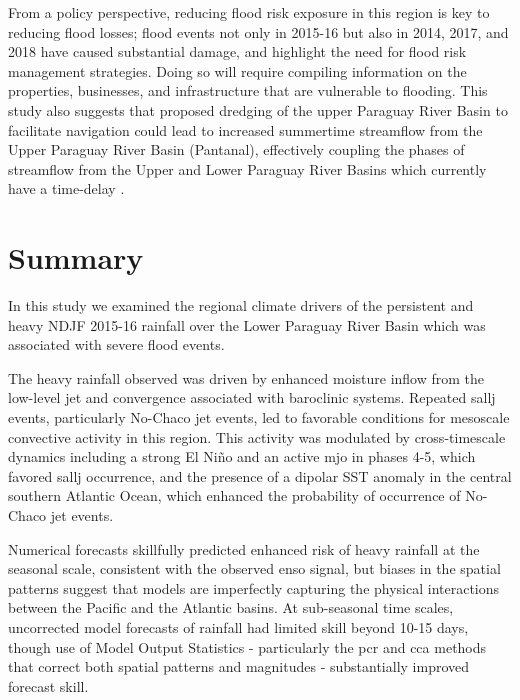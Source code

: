 \documentclass{ametsoc}
\begin{document}
From a policy perspective, reducing flood risk exposure in this region is key to reducing flood losses; flood events not only in 2015-16 but also in 2014, 2017, and 2018 have caused substantial damage, and highlight the need for flood risk management strategies.
Doing so will require compiling information on the properties, businesses, and infrastructure that are vulnerable to flooding.
This study also suggests that proposed dredging of the upper Paraguay River Basin to facilitate navigation could lead to increased summertime streamflow from the Upper Paraguay River Basin (Pantanal), effectively coupling the phases of streamflow from the Upper and Lower Paraguay River Basins which currently have a time-delay \citep{Bravo2011}.


\section{Summary} \label{sec:summary}

In this study we examined the regional climate drivers of the persistent and heavy NDJF 2015-16 rainfall over the Lower Paraguay River Basin which was associated with severe flood events.

The heavy rainfall observed was driven by enhanced moisture inflow from the low-level jet and convergence associated with baroclinic systems.
Repeated \gls{sallj} events, particularly No-Chaco jet events, led to favorable conditions for mesoscale convective activity in this region.
This activity was modulated by cross-timescale dynamics including a strong El Ni\~{n}o and an active \gls{mjo}  in phases 4-5, which favored \gls{sallj} occurrence, and the presence of a dipolar SST anomaly in the central southern Atlantic Ocean, which enhanced the probability of occurrence of No-Chaco jet events.

Numerical forecasts skillfully predicted enhanced risk of heavy rainfall at the seasonal scale, consistent with the observed \gls{enso} signal, but biases in the spatial patterns suggest that models are imperfectly capturing the physical interactions between the Pacific and the Atlantic basins.
At sub-seasonal time scales, uncorrected model forecasts of rainfall had limited skill beyond 10-15 days, though use of Model Output Statistics - particularly the \gls{pcr} and \gls{cca} methods that correct both spatial patterns and magnitudes - substantially improved forecast skill.
\end{document}

